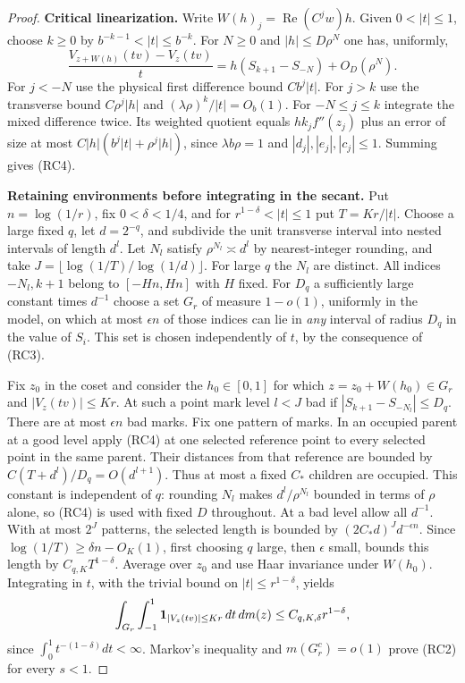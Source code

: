 \documentclass[11pt,a4paper]{article}
\begin{document}
\begin{proof}
\par\smallskip\noindent\textbf{Critical linearization.}\enspace
Write $W(h)_j=\operatorname{Re}(C^j w)h$. Given $0<|t|\le1$, choose
$k\ge0$ by $b^{-k-1}<|t|\le b^{-k}$. For $N\ge0$ and $|h|\le D\rho^N$
one has, uniformly,
\begin{equation}
 \frac{V_{z+W(h)}(tv)-V_z(tv)}{t}
       =h(S_{k+1}-S_{-N})+O_D(\rho^N). \tag{RC4}
\end{equation}
For $j<-N$ use the physical first difference bound $C b^j |t|$.
For $j>k$ use the transverse bound $C\rho^j |h|$ and
$(\lambda\rho)^k/|t|=O_b(1)$. For $-N\le j\le k$ integrate the mixed
difference twice. Its weighted quotient equals $h k_j f''(z_j)$ plus
an error of size at most $C|h|(b^j|t|+\rho^j|h|)$, since
$\lambda b\rho=1$ and $|d_j|,|e_j|,|c_j|\le1$. Summing gives (RC4).

\par\smallskip\noindent\textbf{Retaining environments before integrating in the secant.}\enspace
Put $n=\log(1/r)$, fix $0<\delta<1/4$, and for $r^{1-\delta}<|t|\le1$
put $T=Kr/|t|$. Choose a large fixed $q$, let $d=2^{-q}$, and
subdivide the unit transverse interval into nested intervals of length
$d^l$. Let $N_l$ satisfy $\rho^{N_l}\asymp d^l$ by nearest-integer
rounding, and take $J=\lfloor\log(1/T)/\log(1/d)\rfloor$. For large
$q$ the $N_l$ are distinct. All indices $-N_l,k+1$ belong to
$[-Hn,Hn]$ with $H$ fixed. For $D_q$ a sufficiently large constant
times $d^{-1}$ choose a set $G_r$ of measure $1-o(1)$, uniformly in
the model, on which at most $\epsilon n$ of those indices can lie in
\emph{any} interval of radius $D_q$ in the value of $S_i$. This set
is chosen independently of $t$, by the consequence of (RC3).

Fix $z_0$ in the coset and consider the $h_0\in[0,1]$ for which
$z=z_0+W(h_0)\in G_r$ and $|V_z(tv)|\le Kr$. At such a point mark
level $l<J$ bad if $|S_{k+1}-S_{-N_l}|\le D_q$. There are at most
$\epsilon n$ bad marks. Fix one pattern of marks. In an occupied
parent at a good level apply (RC4) at one selected reference point to
every selected point in the same parent. Their distances from that
reference are bounded by $C(T+d^l)/D_q=O(d^{l+1})$. Thus at most a
fixed $C_*$ children are occupied. This constant is independent of $q$:
rounding $N_l$ makes $d^l/\rho^{N_l}$ bounded in terms of $\rho$ alone,
so (RC4) is used with fixed $D$ throughout. At a bad level allow all $d^{-1}$.
With at most $2^J$ patterns, the selected length is bounded by
$(2C_*d)^Jd^{-\epsilon n}$. Since $\log(1/T)\ge\delta n-O_K(1)$,
first choosing $q$ large, then $\epsilon$ small, bounds this length by
$C_{q,K} T^{1-\delta}$. Average over $z_0$ and use Haar invariance
under $W(h_0)$. Integrating in $t$, with the trivial bound on
$|t|\le r^{1-\delta}$, yields
\[
 \int_{G_r}\int_{-1}^1 {\bf1}_{|V_z(tv)|\le Kr}\,dt\,dm(z)
      \le C_{q,K,\delta}r^{1-\delta},
\]
since $\int_0^1t^{-(1-\delta)}dt<\infty$. Markov's inequality and
$m(G_r^c)=o(1)$ prove (RC2) for every $s<1$.


\end{proof}
\end{document}

